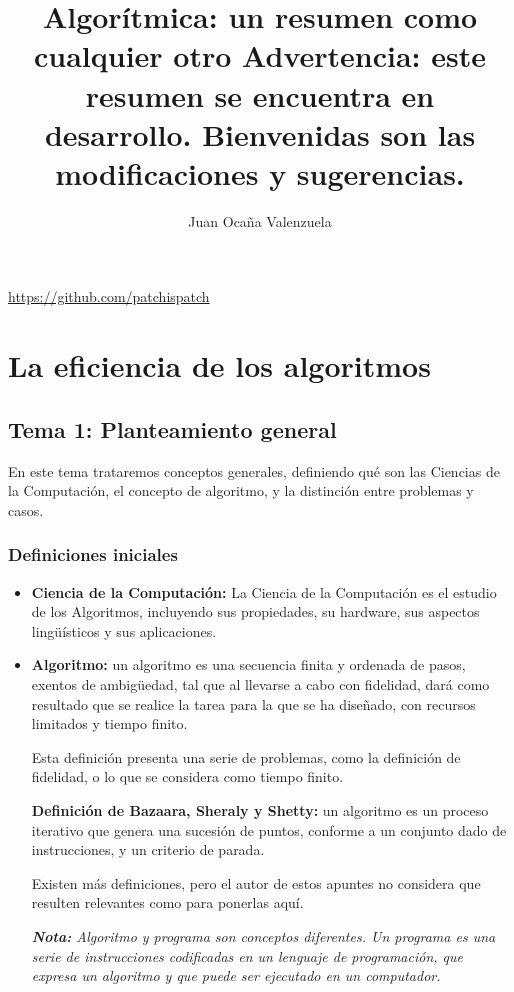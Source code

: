 \documentclass[11pt,a4paper]{article}
\author{	Juan Ocaña Valenzuela}
\title{\textbf{Algorítmica: un resumen como cualquier otro} 
 Advertencia: este resumen se encuentra en desarrollo. Bienvenidas son las modificaciones y sugerencias.}
\begin{document}
\thispagestyle{empty}

\maketitle

\begin{center}
\url{https://github.com/patchispatch}
\end{center}

\newpage

\tableofcontents

\newpage

\section{La eficiencia de los algoritmos}

\subsection{Tema 1: Planteamiento general}

En este tema trataremos conceptos generales, definiendo qué son las Ciencias de la Computación, el concepto de algoritmo, y la distinción entre problemas y casos. 

\subsubsection{Definiciones iniciales}

\begin{itemize}

\item \textbf{Ciencia de la Computación:} La Ciencia de la Computación es el estudio de los Algoritmos, incluyendo sus propiedades, su hardware, sus aspectos lingüísticos y sus aplicaciones.

\item \textbf{Algoritmo:} un algoritmo es una secuencia finita y ordenada de pasos, exentos de ambigüedad, tal que al llevarse a cabo con fidelidad, dará como resultado que se realice la tarea para la que se ha diseñado, con recursos limitados y tiempo finito.

\smallskip

Esta definición presenta una serie de problemas, como la definición de fidelidad, o lo que se considera como tiempo finito. 

\medskip

\textbf{Definición de Bazaara, Sheraly y Shetty:} un algoritmo es un proceso iterativo que genera una sucesión de puntos, conforme a un conjunto dado de instrucciones, y un criterio de parada.

\bigskip

Existen más definiciones, pero el autor de estos apuntes no considera que resulten relevantes como para ponerlas aquí.

\textit{\textbf{Nota:} Algoritmo y programa son conceptos diferentes. Un programa es una serie de instrucciones codificadas en un lenguaje de programación, que expresa un algoritmo y que puede ser ejecutado en un computador.}
\end{itemize}
\end{document}
